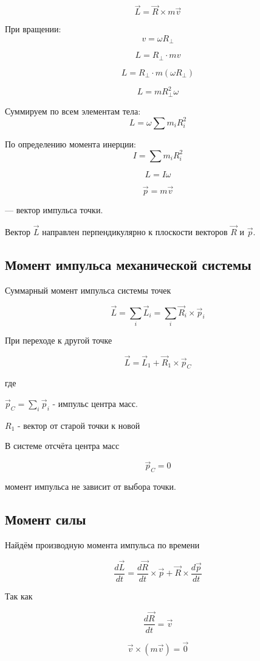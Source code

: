 \documentclass[a4paper,12pt]{article}
\begin{document}
\[
\vec L = \vec R \times m\vec v
\]

При вращении:
\[
v = \omega R_\perp
\]

\[
L = R_\perp \cdot m v
\]

\[
L = R_\perp \cdot m (\omega R_\perp)
\]

\[
L = m R_\perp^2 \omega
\]

Суммируем по всем элементам тела:
\[
L = \omega \sum m_i R_i^2
\]

По определению момента инерции:
\[
I = \sum m_i R_i^2
\]

\[
L = I\omega
\]

\[
\vec p = m \vec v
\]

— вектор импульса точки.

Вектор $\vec L$ направлен перпендикулярно к плоскости векторов $\vec R$ и $\vec p$.
  
\subsection*{Момент импульса механической системы}

Суммарный момент импульса системы точек

\[
\vec L
=
\sum_i \vec L_i
=
\sum_i \vec R_i \times \vec p_i
\]

При переходе к другой точке

\[
\vec L
=
\vec L_1
+
\vec R_1 \times \vec p_C
\]

где


$\vec p_{C} = \sum_i \vec p_i$
- импульс центра масс.



$R_1$
- вектор от старой точки к новой

В системе отсчёта центра масс

\[
\vec p_C = 0
\]

момент импульса не зависит от выбора точки.

\subsection*{Момент силы}

Найдём производную момента импульса по времени

\[
\frac{d\vec L}{dt}
=
\frac{d\vec R}{dt} \times \vec p
+
\vec R \times \frac{d\vec p}{dt}
\]

Так как

\[
\frac{d\vec R}{dt} = \vec v
\]

\[
\vec v \times (m \vec v) = \vec 0
\]
\end{document}
